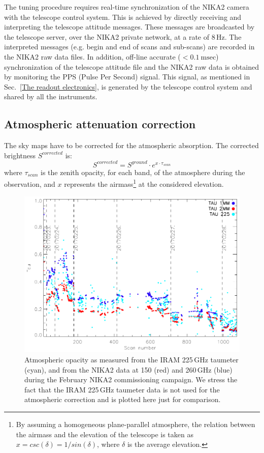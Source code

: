 \documentclass[]{aa} %
\begin{document}
The tuning procedure requires real-time synchronization of the NIKA2 camera with the telescope control system. This is achieved by directly receiving and interpreting the telescope attitude messages. These messages are broadcasted by the telescope server, over the NIKA2 private network, at a rate of 8\,Hz. The interpreted messages (e.g. begin and end of scans and sub-scans) are recorded in the NIKA2 raw data files. In addition, off-line accurate ($< 0.1~ \textrm{msec}$) synchronization of the telescope attitude file and the NIKA2 raw data is obtained by monitoring the PPS (Pulse Per Second) signal. This signal, as mentioned in Sec.~\ref{The readout electronics}, is generated by the telescope control system and shared by all the instruments.


\subsection{Atmospheric attenuation correction}
\label{Atmospheric attenuation correction}


The sky maps have to be corrected for the atmospheric absorption. The corrected brightness $S^{corrected}$ is:
\begin{equation}\label{eq:opa}
S^{corrected} =  S^{ground} \cdot e^{ x \cdot \tau_{scan}}
\end{equation}
where $\tau_{scan}$ is the zenith opacity, for each band, of the atmosphere during the
observation, and $x$ represents the airmass\footnote{By assuming a
  homogeneous plane-parallel atmosphere, the relation between the
  airmass and the elevation of the telescope is taken as $x =
  csc(\delta)=1/sin(\delta)$, where $\delta$ is the average
  elevation.} at the considered elevation.

\begin{figure}
\includegraphics[scale=0.55]{./opacity_evol_run22.pdf}
\caption{Atmospheric opacity as measured from the IRAM 225\,GHz taumeter (cyan), and from the NIKA2 data at 150 (red) and 260\,GHz (blue) during the February NIKA2 commissioning campaign. We stress the fact that the IRAM 225\,GHz taumeter data is not used for the atmospheric correction and is plotted here just for comparison.
  \label{fig:taumeas}}
\end{figure}
\end{document}
